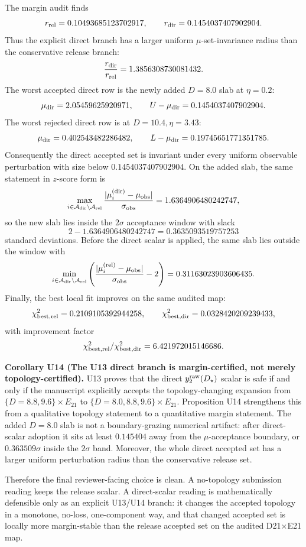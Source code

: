 \documentclass[aps,prd,onecolumn,notitlepage,nofootinbib,superscriptaddress,11pt,floatfix]{revtex4-2}
\begin{document}
The margin audit
finds
\[
r_{\rm rel}=0.10493685123702917,
\qquad
r_{\rm dir}=0.1454037407902904.
\]
Thus the explicit direct branch has a larger uniform \(\mu\)-set-invariance radius than the conservative release branch:
\[
\frac{r_{\rm dir}}{r_{\rm rel}}=1.3856308730081432.
\]
The worst accepted direct row is the newly added \(D=8.0\) slab at \(\eta=0.2\):
\[
\mu_{\rm dir}=2.05459625920971,
\qquad
U-\mu_{\rm dir}=0.1454037407902904.
\]
The worst rejected direct row is at \(D=10.4,\eta=3.43\):
\[
\mu_{\rm dir}=0.402543482286482,
\qquad
L-\mu_{\rm dir}=0.19745651771351785.
\]
Consequently the direct accepted set is invariant under every uniform observable perturbation with size below \(0.1454037407902904\).  On the added slab, the same statement in \(z\)-score form is
\[
\max_{i\in\mathcal A_{\rm dir}\setminus\mathcal A_{\rm rel}}
\frac{|\mu_i^{\rm(dir)}-\mu_{\rm obs}|}{\sigma_{\rm obs}}
=1.6364906480242747,
\]
so the new slab lies inside the \(2\sigma\) acceptance window with slack
\[
2-1.6364906480242747
=0.3635093519757253
\]
standard deviations.  Before the direct scalar is applied, the same slab lies outside the window with
\[
\min_{i\in\mathcal A_{\rm dir}\setminus\mathcal A_{\rm rel}}
\left(
\frac{|\mu_i^{\rm(rel)}-\mu_{\rm obs}|}{\sigma_{\rm obs}}-2
\right)
=0.31163023903606435.
\]
Finally, the best local fit improves on the same audited map:
\[
\chi^2_{\rm best,rel}=0.2109105392944258,
\qquad
\chi^2_{\rm best,dir}=0.0328420209239433,
\]
with improvement factor
\[
\chi^2_{\rm best,rel}/\chi^2_{\rm best,dir}
=6.421972015146686.
\]

\medskip\noindent\textbf{Corollary U14 (The U13 direct branch is margin-certified, not merely topology-certified).}
U13 proves that the direct \(y_2^{\rm raw}(D_\star)\) scalar is safe if and only if the manuscript explicitly accepts the topology-changing expansion from
\(\{D=8.8,9.6\}\times E_{21}\) to
\(\{D=8.0,8.8,9.6\}\times E_{21}\).
Proposition U14 strengthens this from a qualitative topology statement to a quantitative margin statement.  The added \(D=8.0\) slab is not a boundary-grazing numerical artifact: after direct-scalar adoption it sits at least \(0.145404\) away from the \(\mu\)-acceptance boundary, or \(0.363509\sigma\) inside the \(2\sigma\) band.  Moreover, the whole direct accepted set has a larger uniform perturbation radius than the conservative release set.

Therefore the final reviewer-facing choice is clean.  A no-topology submission reading keeps the release scalar.  A direct-scalar reading is mathematically defensible only as an explicit U13/U14 branch: it changes the accepted topology in a monotone, no-loss, one-component way, and that changed accepted set is locally more margin-stable than the release accepted set on the audited D21\(\times\)E21 map.
\end{document}
